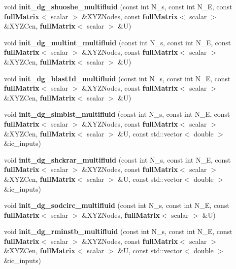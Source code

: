 \begin{DoxyCompactItemize}
\item 
void {\bfseries init\-\_\-dg\-\_\-shuoshe\-\_\-multifluid} (const int N\-\_\-s, const int N\-\_\-\-E, const {\bf full\-Matrix}$<$ scalar $>$ \&X\-Y\-Z\-Nodes, const {\bf full\-Matrix}$<$ scalar $>$ \&X\-Y\-Z\-Cen, {\bf full\-Matrix}$<$ scalar $>$ \&U)\label{init__cond_8cc_a4b9af7af4d2a099b8f8f3efb432ec40a}

\item 
void {\bfseries init\-\_\-dg\-\_\-multint\-\_\-multifluid} (const int N\-\_\-s, const int N\-\_\-\-E, const {\bf full\-Matrix}$<$ scalar $>$ \&X\-Y\-Z\-Nodes, const {\bf full\-Matrix}$<$ scalar $>$ \&X\-Y\-Z\-Cen, {\bf full\-Matrix}$<$ scalar $>$ \&U)\label{init__cond_8cc_a650db4d9601dba17a24282f11d4ec098}

\item 
void {\bfseries init\-\_\-dg\-\_\-blast1d\-\_\-multifluid} (const int N\-\_\-s, const int N\-\_\-\-E, const {\bf full\-Matrix}$<$ scalar $>$ \&X\-Y\-Z\-Nodes, const {\bf full\-Matrix}$<$ scalar $>$ \&X\-Y\-Z\-Cen, {\bf full\-Matrix}$<$ scalar $>$ \&U)\label{init__cond_8cc_a8f126b98d14e7a3093f46ca878bdea54}

\item 
void {\bfseries init\-\_\-dg\-\_\-simblst\-\_\-multifluid} (const int N\-\_\-s, const int N\-\_\-\-E, const {\bf full\-Matrix}$<$ scalar $>$ \&X\-Y\-Z\-Nodes, const {\bf full\-Matrix}$<$ scalar $>$ \&X\-Y\-Z\-Cen, {\bf full\-Matrix}$<$ scalar $>$ \&U, const std\-::vector$<$ double $>$ \&ic\-\_\-inputs)\label{init__cond_8cc_a8cea5bb23886f0e5e32716abafa2301c}

\item 
void {\bfseries init\-\_\-dg\-\_\-shckrar\-\_\-multifluid} (const int N\-\_\-s, const int N\-\_\-\-E, const {\bf full\-Matrix}$<$ scalar $>$ \&X\-Y\-Z\-Nodes, const {\bf full\-Matrix}$<$ scalar $>$ \&X\-Y\-Z\-Cen, {\bf full\-Matrix}$<$ scalar $>$ \&U, const std\-::vector$<$ double $>$ \&ic\-\_\-inputs)\label{init__cond_8cc_a47db1d1184c311aa6f5933cbbd3b07f6}

\item 
void {\bfseries init\-\_\-dg\-\_\-sodcirc\-\_\-multifluid} (const int N\-\_\-s, const int N\-\_\-\-E, const {\bf full\-Matrix}$<$ scalar $>$ \&X\-Y\-Z\-Nodes, {\bf full\-Matrix}$<$ scalar $>$ \&U)\label{init__cond_8cc_a7230f29512c4f783c3d3d71f2a29fee0}

\item 
void {\bfseries init\-\_\-dg\-\_\-rminstb\-\_\-multifluid} (const int N\-\_\-s, const int N\-\_\-\-E, const {\bf full\-Matrix}$<$ scalar $>$ \&X\-Y\-Z\-Nodes, const {\bf full\-Matrix}$<$ scalar $>$ \&X\-Y\-Z\-Cen, {\bf full\-Matrix}$<$ scalar $>$ \&U, const std\-::vector$<$ double $>$ \&ic\-\_\-inputs)\label{init__cond_8cc_a4e4804a15ffb7c55470dc08bda833feb}


\end{DoxyCompactItemize}
